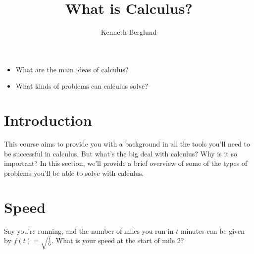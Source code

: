 \documentclass{ximera}
\author{Kenneth Berglund}
\title{What is Calculus?}
\begin{document}
\begin{abstract}
\end{abstract}
\maketitle
%
%
%
\begin{motivatingQuestions}\begin{itemize}
\item What are the main ideas of calculus?
\item What kinds of problems can calculus solve?
\end{itemize}\end{motivatingQuestions}
%
%
%
\section{Introduction}
%
This course aims to provide you with a background in all the tools you'll need to be successful in calculus. But what's the big deal with calculus? Why is it so important? In this section, we'll provide a brief overview of some of the types of problems you'll be able to solve with calculus. 


\section{Speed}
Say you're running, and the number of miles you run in $t$ minutes can be given by $f(t) = \sqrt{\frac{t}{6}}$. What is your speed at the start of mile 2?
\end{document}
